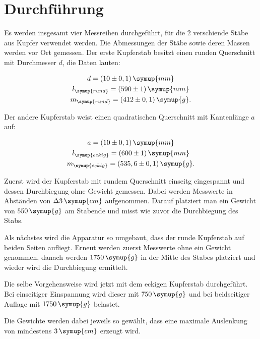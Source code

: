 \section{Durchführung}
\label{sec:Durchführung}

Es werden insgesamt vier Messreihen durchgeführt, für die 2 verschiende Stäbe aus Kupfer verwendet werden.
Die Abmessungen der Stäbe sowie deren Massen werden vor Ort gemessen.
Der erste Kupferstab besitzt einen runden Querschnitt mit Durchmesser $d$, die Daten lauten:

\begin{gather}
    d=(10\pm0,1)\,\symup{mm} \notag \\
    l_{\symup{rund}}=(590\pm1)\,\symup{mm} \notag \\
    m_{\symup{rund}}=(412\pm0,1)\,\symup{g} \notag.
\end{gather}

Der andere Kupferstab weist einen quadratischen Querschnitt mit Kantenlänge $a$ auf:

\begin{gather}
    a=(10\pm0,1)\,\symup{mm} \notag \\
    l_{\symup{eckig}}=(600\pm1)\,\symup{mm} \notag \\
    m_{\symup{eckig}}=(535,6\pm0,1)\,\symup{g} \notag.
\end{gather}

Zuerst wird der Kupferstab mit rundem Querschnitt einseitg eingespannt und dessen Durchbiegung ohne Gewicht gemessen.
Dabei werden Messwerte in Abständen von $\Delta 3\,\symup{cm}$ aufgenommen.
Darauf platziert man ein Gewicht von $550\,\symup{g}$ am Stabende und misst wie zuvor die Durchbiegung des Stabs.

Als nächstes wird die Apparatur so umgebaut, dass der runde Kupferstab auf beiden Seiten aufliegt.
Erneut werden zuerst Messwerte ohne ein Gewicht genommen, danach werden $1750\,\symup{g}$
in der Mitte des Stabes platziert und wieder wird die Durchbiegung ermittelt.

Die selbe Vorgehensweise wird jetzt mit dem eckigen Kupferstab durchgeführt.
Bei einseitiger Einspannung wird dieser mit $750\,\symup{g}$ und bei beidseitiger Auflage mit $1750\,\symup{g}$ belastet.

Die Gewichte werden dabei jeweils so gewählt, dass eine maximale Auslenkung von mindestens $3\,\symup{cm}$ erzeugt wird.